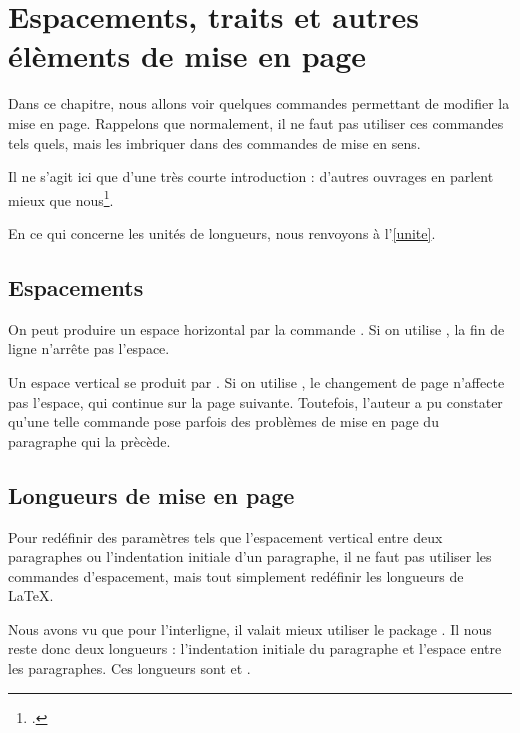 \chapter{Espacements, traits et autres élèments de mise en page}\label{espacement}

\begin{prealable}
Dans ce chapitre, nous allons voir quelques commandes permettant de modifier la mise en page.
Rappelons que normalement, il ne faut pas utiliser ces commandes tels quels, mais les imbriquer dans des commandes de mise en sens.

Il ne s'agit ici que d'une très courte introduction : d'autres ouvrages en parlent mieux que nous\footcites(En particulier)(){frama}{latex_graphic_companion}.

En ce qui concerne les unités de longueurs, nous renvoyons à l'\ref{unite}.
\end{prealable}

\section{Espacements}\label{espace}

On peut produire un espace horizontal par la commande . Si on utilise , la fin de ligne n'arrête pas l'espace.

Un espace vertical se produit par . Si on utilise , le changement de page n'affecte pas  l'espace, qui continue sur la page suivante. Toutefois, l'auteur a pu constater qu'une telle commande pose parfois des problèmes de mise en page du paragraphe qui la prècède.



\section{Longueurs de mise en page}

Pour redéfinir des paramètres tels que l'espacement vertical entre deux paragraphes ou l'indentation initiale d'un paragraphe, il ne faut pas utiliser les commandes d'espacement, mais tout simplement redéfinir les longueurs de \LaTeX. 

Nous avons vu que pour l'interligne, il valait mieux utiliser le package . Il nous reste donc deux longueurs : l'indentation initiale du paragraphe et l'espace entre les paragraphes. Ces longueurs sont  et .

